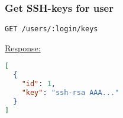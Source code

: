 %
%
%
%
%
%
%


\subsubsection{Get SSH-keys for user}

\begin{lstlisting}[language=http_request]
GET /users/:login/keys
\end{lstlisting}


{\tiny \underline{Response:}}
\begin{lstlisting}[language=json, numbers=none]
[
  {
    "id": 1,
    "key": "ssh-rsa AAA..."
  }
]
\end{lstlisting}
